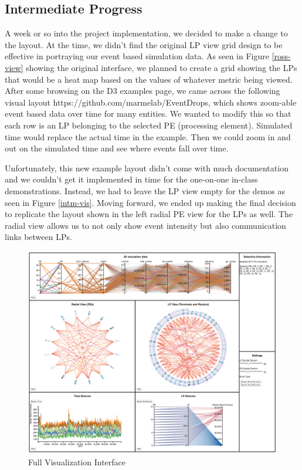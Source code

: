 \documentclass{acm_proc_article-sp}
\begin{document}
\subsection{Intermediate Progress}
A week or so into the project implementation, we decided to make a change to the layout. At the time, we didn't find the original LP view grid design to be effective in portraying our event based simulation data. As seen in Figure \ref{ross-view} showing the original interface, we planned to create a grid showing the LPs that would be a heat map based on the values of whatever metric being viewed. After some browsing on the D3 examples page, we came across the following visual layout https://github.com/marmelab/EventDrops, which shows zoom-able event based data over time for many entities. We wanted to modify this so that each row is an LP belonging to the selected PE (processing element).  Simulated time would replace the actual time in the example.  Then we could zoom in and out on the simulated time and see where events fall over time. 

Unfortunately, this new example layout didn't come with much documentation and we couldn't get it implemented in time for the one-on-one in-class demonstrations. Instead, we had to leave the LP view empty for the demos as seen in Figure \ref{intm-vis}. Moving forward, we ended up making the final decision to replicate the layout shown in the left radial PE view for the LPs as well. The radial view allows us to not only show event intensity but also communication links between LPs.

\begin{figure}[t]
\centering
   \includegraphics[width=6.5in]{actual-vis.png}
\caption{Full Visualization Interface}
\label{actual-vis}
\end{figure}
\end{document}
